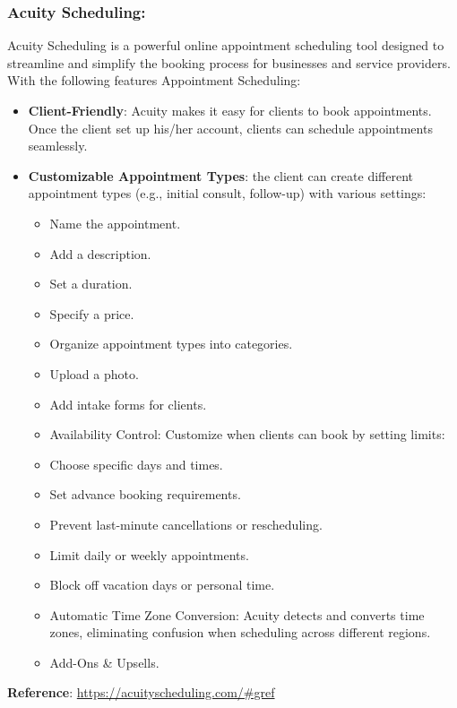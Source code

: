 \documentclass{article}
\begin{document}
      \subsubsection{Acuity Scheduling:}
      Acuity Scheduling is a powerful online appointment scheduling tool designed to streamline and simplify the booking process for businesses and service providers. With the following features Appointment Scheduling:
      \begin{itemize}
      \item \textbf{Client-Friendly}: Acuity makes it easy for clients to book appointments. Once the client set up his/her account, clients can schedule appointments seamlessly.
      \item \textbf{Customizable Appointment Types}: the client can create different appointment types (e.g., initial consult, follow-up) with various settings:
        \begin{itemize}
            \item Name the appointment.
            \item Add a description.
            \item Set a duration.
            \item Specify a price.
            \item Organize appointment types into categories.
            \item Upload a photo.
            \item Add intake forms for clients.
            \item Availability Control: Customize when clients can book by setting limits:
            \item Choose specific days and times.
            \item Set advance booking requirements.
            \item Prevent last-minute cancellations or rescheduling.
            \item Limit daily or weekly appointments.
            \item Block off vacation days or personal time.
            \item Automatic Time Zone Conversion: Acuity detects and converts time zones, eliminating confusion when scheduling across different regions.
            \item Add-Ons \& Upsells.  
        \end{itemize}
      \end{itemize}
      \textbf{Reference}: \href{https://acuityscheduling.com/\#gref}{https://acuityscheduling.com/\#gref} 
\end{document}
